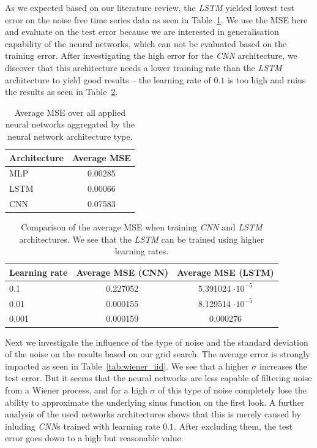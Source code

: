 As we expected based on our literature review, the \emph{LSTM} yielded lowest 
test error
on the noise free time series data as seen in Table~\ref{tab:noisefree_result}.
We use the MSE here and evaluate on the test error because we are interested in 
generalisation capability of the neural networks, which can not be evaluated 
based on the training error.
After investigating the high error for the \emph{CNN} architecture, we discover
that this architecture needs a lower training rate than the \emph{LSTM}
architecture to yield good results -- the learning rate of $0.1$ is too high
and ruins the results as seen in Table~\ref{tab:cnn_training}.

\begin{table}
    \centering
    \begin{tabular}{l|c}
        Architecture & Average MSE \\
        \hline
        MLP          & 0.00285     \\
        LSTM         & 0.00066     \\
        CNN          & 0.07583     \\
    \end{tabular}
    \caption{Average MSE over all applied neural networks aggregated by
        the neural network architecture type.}
    \label{tab:noisefree_result}
\end{table}

\begin{table}
    \centering
    \begin{tabular}{l|c|c}
        Learning rate & Average MSE (CNN) & Average MSE (LSTM)       \\
        \hline
        0.1           & 0.227052          & 5.391024 $\cdot 10^{-5}$ \\
        0.01          & 0.000155          & 8.129514 $\cdot 10^{-5}$ \\
        0.001         & 0.000159          & 0.000276                 \\
    \end{tabular}
    \caption{Comparison of the average MSE when training \emph{CNN} and
        \emph{LSTM} architectures. We see that the \emph{LSTM} can be trained
        using higher learning rates.}
    \label{tab:cnn_training}
\end{table}

Next we investigate the influence of the type of noise
and the standard deviation of the noise on the results 
based on our grid search. The average error is
strongly impacted as seen in Table~\ref{tab:wiener_iid}. We see that
a higher $\sigma$ increases the test error. But it seems that the 
neural networks are less capable of filtering noise from a Wiener process, and 
for a high $\sigma$ of this type of noise completely lose the ability to 
approximate the underlying sinus function on the first look. A further analysis
of the used networks architectures shows that this is merely caused by inluding 
\emph{CNN}s trained with learning rate $0.1$. After excluding them, the test 
error goes down to a high but reasonable value.

